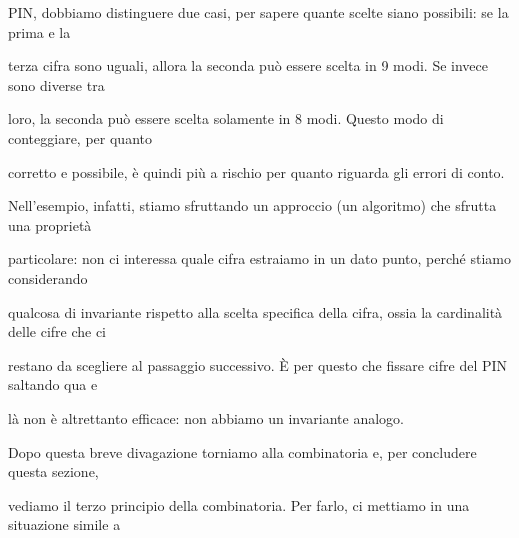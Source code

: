 \documentclass[a4paper,portrait,12pt]{article}
\begin{document}
\begin{flushleft}
PIN, dobbiamo distinguere due casi, per sapere quante scelte siano possibili: se la prima e la
\end{flushleft}


\begin{flushleft}
terza cifra sono uguali, allora la seconda pu\`{o} essere scelta in 9 modi. Se invece sono diverse tra
\end{flushleft}


\begin{flushleft}
loro, la seconda pu\`{o} essere scelta solamente in 8 modi. Questo modo di conteggiare, per quanto
\end{flushleft}


\begin{flushleft}
corretto e possibile, \`{e} quindi più a rischio per quanto riguarda gli errori di conto.
\end{flushleft}


\begin{flushleft}
Nell'esempio, infatti, stiamo sfruttando un approccio (un algoritmo) che sfrutta una propriet\`{a}
\end{flushleft}


\begin{flushleft}
particolare: non ci interessa quale cifra estraiamo in un dato punto, perch\'{e} stiamo considerando
\end{flushleft}


\begin{flushleft}
qualcosa di invariante rispetto alla scelta specifica della cifra, ossia la cardinalit\`{a} delle cifre che ci
\end{flushleft}


\begin{flushleft}
restano da scegliere al passaggio successivo. \`{E} per questo che fissare cifre del PIN saltando qua e
\end{flushleft}


\begin{flushleft}
l\`{a} non \`{e} altrettanto efficace: non abbiamo un invariante analogo.
\end{flushleft}


\begin{flushleft}
Dopo questa breve divagazione torniamo alla combinatoria e, per concludere questa sezione,
\end{flushleft}


\begin{flushleft}
vediamo il terzo principio della combinatoria. Per farlo, ci mettiamo in una situazione simile a
\end{flushleft}
\end{document}
